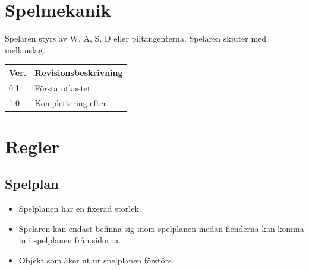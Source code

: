 \documentclass{TDP005mall}
\begin{document}
\section{Spelmekanik}
Spelaren styrs av W, A, S, D eller piltangenterna. Spelaren skjuter med mellanslag.
\begin{table}[!h]
\begin{tabularx}{\linewidth}{|X|X|}
\hline
Ver. & Revisionsbeskrivning\\\hline
0.1 & Första utkastet\\\hline
1.0 & Komplettering efter\\\hline

\end{tabularx}
\end{table}

\section{Regler}

\subsection{Spelplan}
\begin{itemize}
\item Spelplanen har en fixerad storlek.
\item Spelaren kan endast befinna sig inom spelplanen medan fienderna kan komma in i spelplanen från sidorna. 
\item Objekt som åker ut ur spelplanen förstörs.
\end{itemize}
\end{document}
